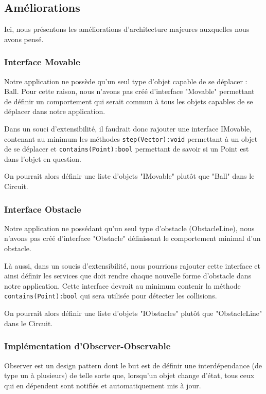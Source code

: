 \documentclass{report}
\begin{document}
\subsection{Améliorations}

Ici, nous présentons les améliorations d'architecture majeures auxquelles nous avons pensé.

\subsubsection{Interface Movable}

Notre application ne possède qu'un seul type d'objet capable de se déplacer : Ball. Pour cette raison, nous n'avons pas créé d'interface "Movable" permettant de définir un comportement qui serait commun à tous les objets capables de se déplacer dans notre application. 

Dans un souci d'extensibilité, il faudrait donc rajouter une interface IMovable, contenant au minimum les méthodes \texttt{step(Vector):void} permettant à un objet de se déplacer et \texttt{contains(Point):bool} permettant de savoir si un Point est dans l'objet en question.

On pourrait alors définir une liste d'objets "IMovable" plutôt que "Ball" dans le Circuit.

\subsubsection{Interface Obstacle}

Notre application ne possédant qu'un seul type d'obstacle (ObstacleLine), nous n'avons pas créé d'interface "Obstacle" définissant le comportement minimal d'un obstacle. 

Là aussi, dans un soucis d'extensibilité, nous pourrions rajouter cette interface et ainsi définir les services que doit rendre chaque nouvelle forme d'obstacle dans notre application. Cette interface devrait au minimum contenir la méthode \texttt{contains(Point):bool} qui sera utilisée pour détecter les collisions.

On pourrait alors définir une liste d'objets "IObstacles" plutôt que "ObstacleLine" dans le Circuit.

\subsubsection{Implémentation d'Observer-Observable}

Observer est un design pattern dont le but est de définir une interdépendance (de type un à plusieurs) de telle sorte que, lorsqu'un objet change d'état, tous ceux qui en dépendent sont notifiés et automatiquement mis à jour.
\end{document}
